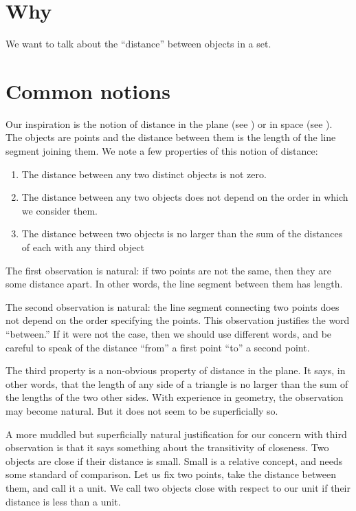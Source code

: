 
\section*{Why}

We want to talk about the ``distance'' between objects in a set.

\section*{Common notions}

Our inspiration is the notion of distance in the plane (see ) or in space (see ).
The objects are points and the distance between them is the length of the line segment joining them.
We note a few properties of this notion of distance:
    \begin{enumerate}
      \item The distance between any two distinct objects is not zero.
      \item The distance between any two objects does not depend on the order in which we consider them.
      \item The distance between two objects is no larger than the sum of the distances of each with any third object
    \end{enumerate}

The first observation is natural: if two points are not the same, then they are some distance apart.
In other words, the line segment between them has length.

The second observation is natural: the line segment connecting two points does not depend on the order specifying the points.
This observation justifies the word ``between.''
If it were not the case, then we should use different words, and be careful to speak of the distance ``from'' a first point ``to'' a second point.

The third property is a non-obvious property of distance in the plane.
It says, in other words, that the length of any side of a triangle is no larger than the sum of the lengths of the two other sides.
With experience in geometry, the observation may become natural.
But it does not seem to be superficially so.

A more muddled but superficially natural justification for our concern with third observation is that it says something about the transitivity of closeness.
Two objects are close if their distance is small.
Small is a relative concept, and needs some standard of comparison.
Let us fix two points, take the distance between them, and call it a unit.
We call two objects close with respect to our unit if their distance is less than a unit.

